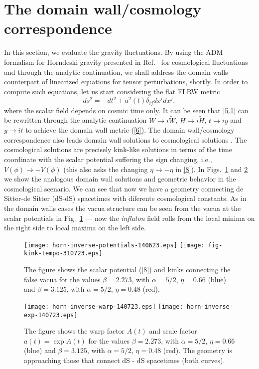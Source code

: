 \documentclass[aps,12pt, a4paper,nofootinbib]{revtex4}
\begin{document}
{\section{The domain wall/cosmology correspondence}\label{z3}
In this section, we evaluate the gravity fluctuations. By using the ADM formalism for Horndeski gravity presented in Ref.~\cite{Kob} for cosmological fluctuations and through the analytic continuation, we shall address the domain walls counterpart of linearized equations for tensor perturbations, shortly. In order to compute such equations, let us start considering the flat FLRW metric
\begin{equation}
ds^{2}=-dt^{2}+a^{2}(t)\delta_{ij}dx^{i}dx^{j},\label{5.1}
\end{equation}
where the scalar field depends on cosmic time only. It can be seen that \eqref{5.1} can be rewritten through the analytic continuation $W\to i\tilde{W}$, $H\to i\tilde{H}$, $t\to iy$ and $y\to it$ to achieve the domain wall metric (\ref{6}). The domain wall/cosmology correspondence also leads domain wall solutions to cosmological solutions \cite{Skenderis:2006jq}. The cosmological solutions are precisely kink-like solutions in terms of the time coordinate with the scalar potential suffering the sign changing, i.e., $V(\phi)\to - V(\phi)$ (this also asks the changing $\eta\to -\eta$ in \eqref{8}). In Figs.~\ref{p0-3} and \ref{p0-4} we show the analogous domain wall solutions and geometric  behavior in the cosmological scenario. We can see that now we have a geometry connecting de Sitter-de Sitter (dS-dS) spacetimes with diferente cosmological constants. As in the domain walls cases the vacua structure can be seen from the vacua at the scalar potentials in Fig.~\ref{p0-3} --- now the {\sl inflaton} field rolls from the local minima on the right side to local maxima on the left side.

\begin{figure}[!ht]
\begin{center}
\texttt{[image: horn-inverse-potentials-140623.eps]}\qquad\qquad\qquad
\texttt{[image: fig-kink-tempo-310723.eps]}
\caption{The figure shows the scalar potential (\ref{8}) and kinks connecting the false vacua for the values $\beta=2.273$, with $\alpha=5/2$, $\eta=0.66$ (blue) and $\beta=3.125$, with $\alpha=5/2$, $\eta=0.48$ (red).}
\label{p0-3}
\end{center}
\end{figure}

\begin{figure}[!ht]
\begin{center}
\texttt{[image: horn-inverse-warp-140723.eps]}\qquad\qquad\qquad
\texttt{[image: horn-inverse-exp-140723.eps]}
\caption{The figure shows the warp factor $A(t)$ and scale factor $a(t)=\exp{A(t)}$ for the values $\beta=2.273$, with $\alpha=5/2$, $\eta=0.66$ (blue) and $\beta=3.125$, with $\alpha=5/2$, $\eta=0.48$ (red). The geometry is approaching those that connect dS - dS spacetimes (both curves). }
\label{p0-4}
\end{center}
\end{figure}

}
\end{document}

